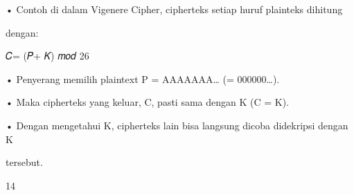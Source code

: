 \documentclass{article}
\begin{document}

• Contoh di dalam Vigenere Cipher, cipherteks setiap huruf plainteks dihitung 

dengan:

               𝐶= (𝑃+ 𝐾) 𝑚𝑜𝑑 26

• Penyerang memilih plaintext P = AAAAAAA… (= 000000…).

• Maka cipherteks yang keluar, C, pasti sama dengan K    (C = K).

• Dengan mengetahui K, cipherteks lain bisa langsung dicoba didekripsi dengan K 

tersebut.

14
\end{document}
